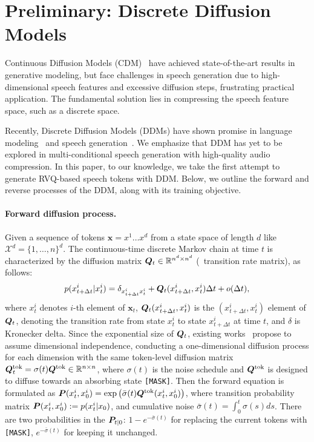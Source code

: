 
\section{Preliminary: Discrete Diffusion Models}
\label{subsec:discrete_diffusion}

Continuous Diffusion Models (CDM)~\cite{videodiff_latent/BlattmannRLD0FK23,styletts2/LiHRMM23,mmgeneration/RuanMYH0FYJG23} have achieved state-of-the-art results in generative modeling, but face challenges in speech generation due to high-dimensional speech features and excessive diffusion steps, frustrating practical application. 
The fundamental solution lies in compressing the speech feature space, such as a discrete space. 

Recently, Discrete Diffusion Models (DDMs) have shown promise in language modeling~\cite{ConcreteScoreMatch:conf/nips/MengCSE22,SEDD:conf/icml/LouME24} and speech generation~\cite{diffsound:journals/taslp/YangYWWWZY23,DCTTS:conf/icassp/WuLLY24}. We emphasize that DDM has yet to be explored in multi-conditional speech generation with high-quality audio compression. In this paper, to our knowledge, we take the first attempt to generate RVQ-based speech tokens with DDM. 
Below, we outline the forward and reverse processes of the DDM, along with its training objective.

\paragraph{Forward diffusion process.~~\xspace}
Given a sequence of tokens $\bm{x} = x^1 \ldots x^d$ from a state space of length $d$ like $\mathcal{X}^d = \{1, \ldots, n\}^d$. The continuous-time discrete Markov chain at time $t$ is characterized by the diffusion matrix ${\bm{Q}}_t\in \mathbb{R}^{n^d\times n^d}$ (\ie~transition rate matrix), as follows:
\begin{equation}
\label{eq:delta_transition}
    p({x}_{t+ \Delta t}^i|x_t^i) =  \delta_{{x}^i_{t+ \Delta t}x^i_t} + {\bm{Q}}_t({x}^i_{t+ \Delta t},x^i_t)\Delta t + o(\Delta t),
\end{equation}
where $x^i_t$ denotes $i$-th element of $\bm{x}_t$, ${\bm{Q}}_t({x}^i_{t+ \Delta t},x^i_t)$ is the $({x}^i_{t+ \Delta t},x^i_t)$ element of ${\bm{Q}}_t$, denoting the transition rate from state $x^i_t$ to state ${x}^i_{t+ \Delta t}$ at time $t$, and $\delta$ is Kronecker delta. 
Since the exponential size of ${\bm{Q}}_t$, existing works~\cite{SEDD:conf/icml/LouME24,RADD:journals/corr/abs-2406-03736} propose to assume dimensional independence, conducting a one-dimensional diffusion process for each dimension with the same token-level diffusion matrix ${\bm{Q}}_t^\text{tok}=\sigma(t){\bm{Q}}^\text{tok}\in \mathbb{R}^{n\times n}$, where $\sigma(t)$ is the noise schedule and ${\bm{Q}}^\text{tok}$ is designed to diffuse towards an absorbing state \texttt{[MASK]}. Then the forward equation is formulated as ${\bm{P}}({x}^i_t,x^i_0) = \exp\left(\bar{\sigma}(t) {\bm{Q}}^\text{tok}({x}^i_t,x^i_0) \right)$, where transition probability matrix ${\bm{P}}({x}^i_t,x^i_0) := p({x}^i_t|x_0)$, and cumulative noise $\bar{\sigma}(t) = \int_0^t \sigma(s)ds$. There are two probabilities in the ${\bm{P}}_{t|0}$: \( 1 - e^{-\bar{\sigma}(t)} \) for replacing the current tokens with \texttt{[MASK]}, \( e^{-\bar{\sigma}(t)} \) for keeping it unchanged.

